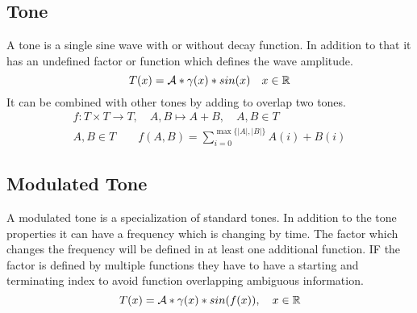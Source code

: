 \subsection{Tone}
	A tone is a single sine wave with or without decay function. In addition to that it has an undefined factor or function which defines the wave amplitude. 
	\begin{equation}\label{ToneRef}
		T(x)=\mathcal{A} * \gamma(x) * sin(x) \quad x\in\mathbb{R}
	\end{equation}
	It can be combined with other tones by adding to overlap two tones.
	\begin{eqnarray}\label{ToneOperationRef}
		f:T \times T \rightarrow T, \quad A,B \mapsto A+B, \quad A,B\in T\nonumber \\
		A,B \in T \qquad f(A,B)=\sum_{i=0}^{\max\{|A| ,|B|\}} A(i)+B(i) 
	\end{eqnarray}

\subsection{Modulated Tone}
	A modulated tone is a specialization of standard tones. In addition to the tone properties it can have a frequency which is changing by time. The factor which changes the frequency will be defined in at least one additional function. IF the factor is defined by multiple functions they have to have a starting and terminating index to avoid function overlapping ambiguous information.
	\begin{equation}\label{ModToneRef}
		T(x)=\mathcal{A} * \gamma(x) * sin(f(x)), \quad x\in\mathbb{R}
	\end{equation}